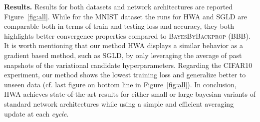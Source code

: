 \documentclass[tablecaption=bottom,wcp]{jmlr} %
\begin{document}
\vspace{0.08in}
\noindent \textbf{Results.} \hspace{0.1in} 
Results for both datasets and network architectures are reported Figure~\ref{fig:all}.
While for the MNIST dataset the runs for \textsc{HWA} and \textsc{SGLD} are comparable both in terms of train and testing loss and accuracy, they both highlights better convergence properties compared to \textsc{BayesByBackprop} (BBB).
It is worth mentioning that our method \textsc{HWA} displays a similar behavior as a gradient based method, such as \textsc{SGLD}, by only leveraging the average of past snapshots of the variational candidate hyperparameters. 
Regarding the CIFAR10 experiment, our method shows the lowest training loss and generalize better to unseen data (cf. last figure on bottom line in Figure~\ref{fig:all}).
In conclusion, \textsc{HWA} achieves state-of-the-art results for either small or large bayesian variants of standard network architectures while using a simple and efficient averaging update at each \textit{cycle}.
\end{document}
